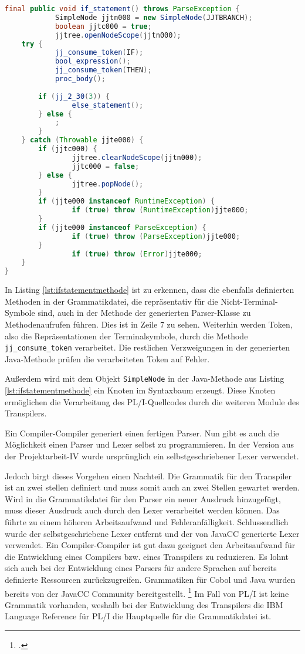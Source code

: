 \begin{lstlisting}[language=Java, caption=Verkürzte If-Statement Methode aus dem Parser, label={lst:ifstatementmethode}]
 final public void if_statement() throws ParseException {
			SimpleNode jjtn000 = new SimpleNode(JJTBRANCH);
			boolean jjtc000 = true;
			jjtree.openNodeScope(jjtn000);
	try {
			jj_consume_token(IF);
			bool_expression();
			jj_consume_token(THEN);
			proc_body();
		
		if (jj_2_30(3)) {
				else_statement();
		} else {
			;
		}
	} catch (Throwable jjte000) {
		if (jjtc000) {
				jjtree.clearNodeScope(jjtn000);
				jjtc000 = false;
		} else {
				jjtree.popNode();
		}
		if (jjte000 instanceof RuntimeException) {
				if (true) throw (RuntimeException)jjte000;
		}
		if (jjte000 instanceof ParseException) {
				if (true) throw (ParseException)jjte000;
		}
				if (true) throw (Error)jjte000;
	}
}	
\end{lstlisting}

In Listing \ref{lst:ifstatementmethode} ist zu erkennen, dass die ebenfalls definierten Methoden in der Grammatikdatei, die repräsentativ für die Nicht-Terminal-Symbole sind, auch in der Methode der generierten Parser-Klasse zu Methodenaufrufen führen. Dies ist in Zeile 7 zu sehen. Weiterhin werden Token, also die Repräsentationen der Terminalsymbole, durch die Methode \verb+jj_consume_token+ verarbeitet. Die restlichen Verzweigungen in der generierten Java-Methode prüfen die verarbeiteten Token auf Fehler.

Außerdem wird mit dem Objekt \verb+SimpleNode+ in der Java-Methode aus Listing \ref{lst:ifstatementmethode} ein Knoten im Syntaxbaum erzeugt. Diese Knoten ermöglichen die Verarbeitung des PL/I-Quellcodes durch die weiteren Module des Transpilers.


Ein Compiler-Compiler generiert einen fertigen Parser. Nun gibt es auch die Möglichkeit einen Parser und Lexer selbst zu programmieren. In der Version aus der Projektarbeit-IV wurde ursprünglich ein selbstgeschriebener Lexer verwendet.

Jedoch birgt dieses Vorgehen einen Nachteil. Die Grammatik für den Transpiler ist an zwei stellen definiert und muss somit auch an zwei Stellen gewartet werden.
Wird in die Grammatikdatei für den Parser ein neuer Ausdruck hinzugefügt, muss dieser Ausdruck auch durch den Lexer verarbeitet werden können.
Das führte zu einem höheren Arbeitsaufwand und Fehleranfälligkeit. Schlussendlich wurde der selbstgeschriebene Lexer entfernt und der von JavaCC generierte Lexer verwendet.
Ein Compiler-Compiler ist gut dazu geeignet den Arbeitsaufwand für die Entwicklung eines Compilers bzw. eines Transpilers zu reduzieren. 
Es lohnt sich auch bei der Entwicklung eines Parsers für andere Sprachen auf bereits definierte Ressourcen zurückzugreifen. 
Grammatiken für Cobol und Java wurden bereits von der JavaCC Community bereitgestellt. \footcite[Vgl. ][]{javaccdoku}
Im Fall von PL/I ist keine Grammatik vorhanden, weshalb bei der Entwicklung des Transpilers die IBM Language Reference für PL/I die Hauptquelle für die Grammatikdatei ist.   

